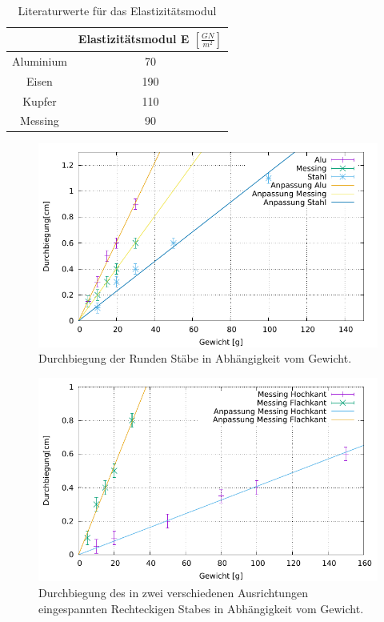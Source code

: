 \begin{table}[h]
	\caption{Literaturwerte für das Elastizitätsmodul \protect\footnotemark}
	\begin{tabular}{|c|c|}
		\hline
		& Elastizitätsmodul E $\left[\frac{GN}{m^2}\right]$\\
		\hline
		Aluminium & 70 \\
		\hline
		Eisen & 190 \\
		\hline
		Kupfer & 110 \\
		\hline
		Messing & 90 \\
		\hline
	\end{tabular}
	\label{tab:ElaLit}
\end{table}

\begin{figure}[h]
	\centering
	\includegraphics[width=1\textwidth]{res/Rund.pdf}
	\caption{Durchbiegung der Runden Stäbe in Abhängigkeit vom Gewicht.}
	\label{figdurchbiegungRund}
\end{figure}

\begin{figure}[h]
	\centering
	\includegraphics[width=1\textwidth]{res/Eckig.pdf}
	\caption{Durchbiegung des in zwei verschiedenen Ausrichtungen eingespannten Rechteckigen Stabes in Abhängigkeit vom Gewicht.}
	\label{fig:durchbiegungEckig}
\end{figure}



